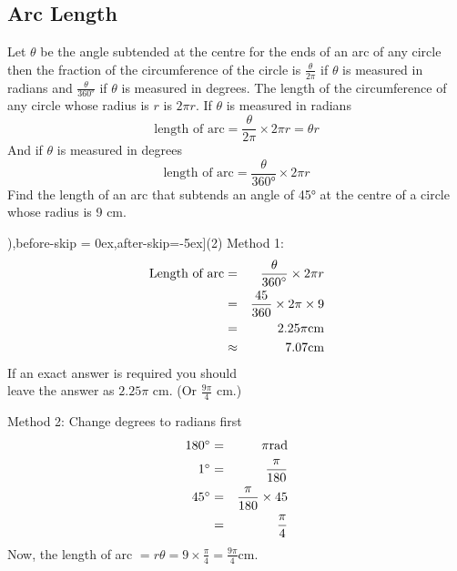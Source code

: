 \subsection*{Arc Length}
Let $\theta $ be the angle subtended at the centre for the ends of an arc of any circle then the fraction of the circumference of the circle is $\frac{\theta }{2 \pi }$ if $\theta $ is measured in radians and $\frac{\theta }{\ang{360}}$ if $\theta $ is measured in degrees. The length of the circumference of any circle whose radius is $r$ is $2 \pi  r$. If $\theta $ is measured in radians
\begin{equation*}\text{length of arc} =\frac{\theta }{2 \pi } \times 2 \pi  r =\theta  r
\end{equation*}
And if $\theta $ is measured in degrees
\begin{equation*}\text{length of arc} =\frac{\theta }{\ang{360}} \times 2 \pi  r
\end{equation*}
\example Find the length of an arc that subtends an angle of \ang{45} at the centre of a circle whose radius is 9 cm. 

\solution \begin{tasks}[counter-format=(tsk[1]),before-skip = {0ex},after-skip={-5ex}](2)
	\task Method 1:\begin{eqnarray*}\text{Length of arc} &  = & \frac{\theta }{360 \mbox{{\ensuremath{{}^\circ}}}} \times 2 \pi  r \\
	&  = & \frac{45}{360} \times 2 \pi  \times 9 \\
	&  = & 2.25 \pi \text{}\mbox{cm} \\
	&  \approx  & 7.07\text{}\mbox{cm}\end{eqnarray*}
If an exact answer is required you should\\ leave the answer as $2.25 \pi $ $\mbox{cm}$. (Or $\frac{9 \pi }{4}$ $\mbox{cm}\text{.}$) 

\task Method 2: Change degrees to radians first
\begin{eqnarray*}180 \mbox{{\ensuremath{{}^\circ}}} &  = & \pi \text{}\mbox{rad} \\
	1 \mbox{{\ensuremath{{}^\circ}}} &  = & \frac{\pi }{180} \\
	45 \mbox{{\ensuremath{{}^\circ}}} &  = & \frac{\pi }{180} \times 45 \\
	&  = & \frac{\pi }{4}\end{eqnarray*}
Now, the length of arc $= r \theta = 9 \times \frac{\pi }{4} =\frac{9 \pi }{4}\text{}\mbox{cm}$.
\end{tasks}
